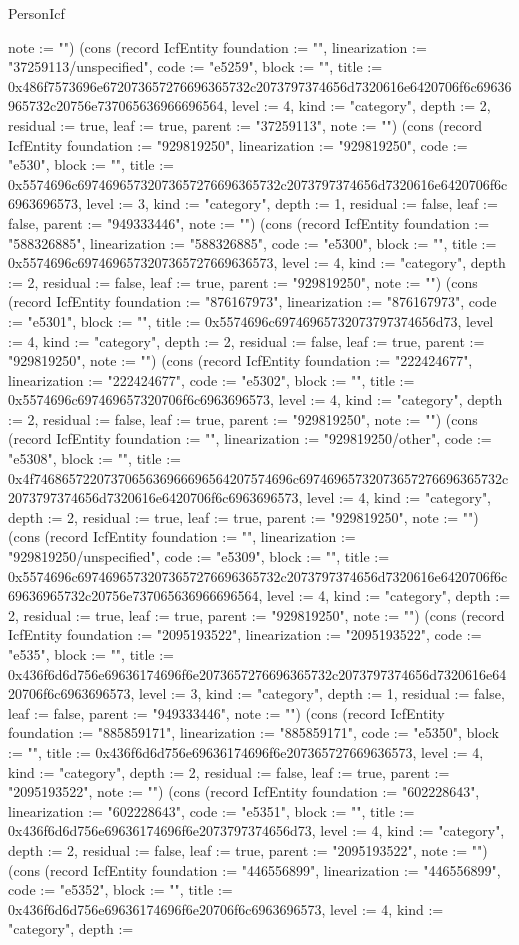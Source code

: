 \begin{lexlean}{PersonIcf}
\begin{semanticmodule}
{note := ""}) (cons (record IcfEntity {foundation := "", linearization := "37259113/unspecified", code := "e5259", block := "", title := 0x486f7573696e672073657276696365732c2073797374656d7320616e6420706f6c69636965732c20756e737065636966696564, level := 4, kind := "category", depth := 2, residual := true, leaf := true, parent := "37259113", note := ""}) (cons (record IcfEntity {foundation := "929819250", linearization := "929819250", code := "e530", block := "", title := 0x5574696c69746965732073657276696365732c2073797374656d7320616e6420706f6c6963696573, level := 3, kind := "category", depth := 1, residual := false, leaf := false, parent := "949333446", note := ""}) (cons (record IcfEntity {foundation := "588326885", linearization := "588326885", code := "e5300", block := "", title := 0x5574696c6974696573207365727669636573, level := 4, kind := "category", depth := 2, residual := false, leaf := true, parent := "929819250", note := ""}) (cons (record IcfEntity {foundation := "876167973", linearization := "876167973", code := "e5301", block := "", title := 0x5574696c69746965732073797374656d73, level := 4, kind := "category", depth := 2, residual := false, leaf := true, parent := "929819250", note := ""}) (cons (record IcfEntity {foundation := "222424677", linearization := "222424677", code := "e5302", block := "", title := 0x5574696c697469657320706f6c6963696573, level := 4, kind := "category", depth := 2, residual := false, leaf := true, parent := "929819250", note := ""}) (cons (record IcfEntity {foundation := "", linearization := "929819250/other", code := "e5308", block := "", title := 0x4f7468657220737065636966696564207574696c69746965732073657276696365732c2073797374656d7320616e6420706f6c6963696573, level := 4, kind := "category", depth := 2, residual := true, leaf := true, parent := "929819250", note := ""}) (cons (record IcfEntity {foundation := "", linearization := "929819250/unspecified", code := "e5309", block := "", title := 0x5574696c69746965732073657276696365732c2073797374656d7320616e6420706f6c69636965732c20756e737065636966696564, level := 4, kind := "category", depth := 2, residual := true, leaf := true, parent := "929819250", note := ""}) (cons (record IcfEntity {foundation := "2095193522", linearization := "2095193522", code := "e535", block := "", title := 0x436f6d6d756e69636174696f6e2073657276696365732c2073797374656d7320616e6420706f6c6963696573, level := 3, kind := "category", depth := 1, residual := false, leaf := false, parent := "949333446", note := ""}) (cons (record IcfEntity {foundation := "885859171", linearization := "885859171", code := "e5350", block := "", title := 0x436f6d6d756e69636174696f6e207365727669636573, level := 4, kind := "category", depth := 2, residual := false, leaf := true, parent := "2095193522", note := ""}) (cons (record IcfEntity {foundation := "602228643", linearization := "602228643", code := "e5351", block := "", title := 0x436f6d6d756e69636174696f6e2073797374656d73, level := 4, kind := "category", depth := 2, residual := false, leaf := true, parent := "2095193522", note := ""}) (cons (record IcfEntity {foundation := "446556899", linearization := "446556899", code := "e5352", block := "", title := 0x436f6d6d756e69636174696f6e20706f6c6963696573, level := 4, kind := "category", depth := }
\end{semanticmodule}
\end{lexlean}
